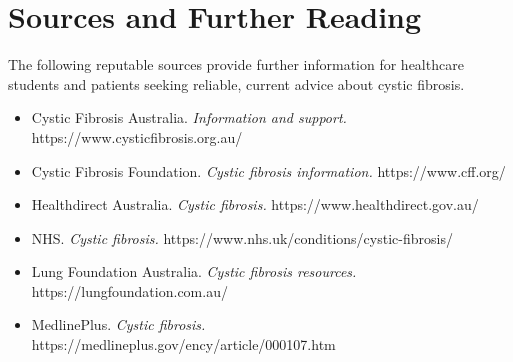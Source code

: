 \section*{Sources and Further Reading}
The following reputable sources provide further information for healthcare students and patients seeking reliable, current advice about cystic fibrosis.

\begin{itemize}
    \item Cystic Fibrosis Australia. \textit{Information and support.} https://www.cysticfibrosis.org.au/
    \item Cystic Fibrosis Foundation. \textit{Cystic fibrosis information.} https://www.cff.org/
    \item Healthdirect Australia. \textit{Cystic fibrosis.} https://www.healthdirect.gov.au/
    \item NHS. \textit{Cystic fibrosis.} https://www.nhs.uk/conditions/cystic-fibrosis/
    \item Lung Foundation Australia. \textit{Cystic fibrosis resources.} https://lungfoundation.com.au/
    \item MedlinePlus. \textit{Cystic fibrosis.} https://medlineplus.gov/ency/article/000107.htm
\end{itemize}
